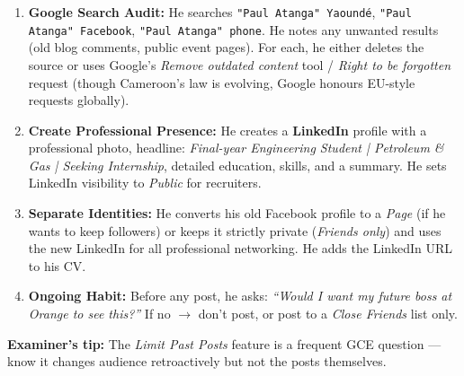 \documentclass[11pt]{article}
\begin{document}
\begin{exoresolu}
\begin{enumerate}
        \item \textbf{Google Search Audit:} He searches \texttt{"Paul Atanga" Yaoundé}, \texttt{"Paul Atanga" Facebook}, \texttt{"Paul Atanga" phone}. He notes any unwanted results (old blog comments, public event pages). For each, he either deletes the source or uses Google's \textit{Remove outdated content} tool / \textit{Right to be forgotten} request (though Cameroon's law is evolving, Google honours EU-style requests globally).
        \item \textbf{Create Professional Presence:} He creates a \textbf{LinkedIn} profile with a professional photo, headline: \textit{Final-year Engineering Student | Petroleum \& Gas | Seeking Internship}, detailed education, skills, and a summary. He sets LinkedIn visibility to \textit{Public} for recruiters.
        \item \textbf{Separate Identities:} He converts his old Facebook profile to a \textit{Page} (if he wants to keep followers) or keeps it strictly private (\textit{Friends only}) and uses the new LinkedIn for all professional networking. He adds the LinkedIn URL to his CV.
        \item \textbf{Ongoing Habit:} Before any post, he asks: \textit{``Would I want my future boss at Orange to see this?''} If no $\rightarrow$ don't post, or post to a \textit{Close Friends} list only.
    \end{enumerate}
    \textbf{Examiner's tip:} The \textit{Limit Past Posts} feature is a frequent GCE question — know it changes audience retroactively but not the posts themselves.
\end{exoresolu}
\end{document}

